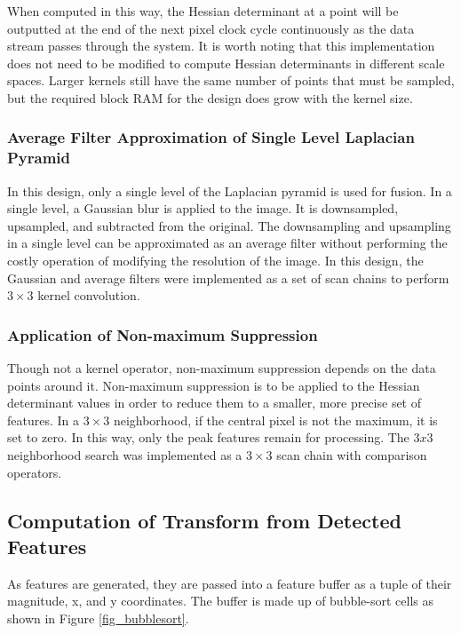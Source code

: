 \documentclass{article}
\begin{document}
When computed in this way, the Hessian determinant at a point will be outputted at the end of the next pixel clock cycle continuously as the data stream passes through the system. It is worth noting that this implementation does not need to be modified to compute Hessian determinants in different scale spaces. Larger kernels still have the same number of points that must be sampled, but the required block RAM for the design does grow with the kernel size.

\subsubsection{Average Filter Approximation of Single Level Laplacian Pyramid}

In this design, only a single level of the Laplacian pyramid is used for fusion. In a single level, a Gaussian blur is applied to the image. It is downsampled, upsampled, and subtracted from the original. The downsampling and upsampling in a single level can be approximated as an average filter without performing the costly operation of modifying the resolution of the image. In this design, the Gaussian and average filters were implemented as a set of scan chains to perform $3 \times 3$ kernel convolution.

\subsubsection{Application of Non-maximum Suppression}

Though not a kernel operator, non-maximum suppression depends on the data points around it. Non-maximum suppression is to be applied to the Hessian determinant values in order to reduce them to a smaller, more precise set of features. In a $3 \times 3$ neighborhood, if the central pixel is not the maximum, it is set to zero. In this way, only the peak features remain for processing. The $3x3$ neighborhood search was implemented as a $3 \times 3$ scan chain with comparison operators.

\subsection{Computation of Transform from Detected Features}

As features are generated, they are passed into a feature buffer as a tuple of their magnitude, x, and y coordinates. The buffer is made up of bubble-sort cells as shown in Figure \ref{fig_bubblesort}.
\end{document}
